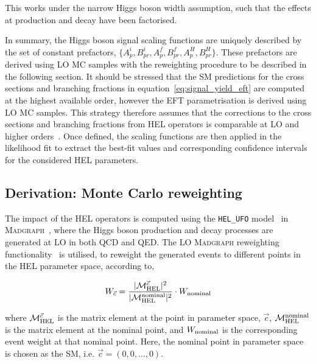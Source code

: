 \noindent
This works under the narrow Higgs boson width assumption, such that the effects at production and decay have been factorised.

In summary, the Higgs boson signal scaling functions are uniquely described by the set of constant prefactors, $\{A^i_p,B^i_{pr},A^f_p,B^f_{pr},A^{H}_p,B^{H}_{pr}\}$. These prefactors are derived using LO MC samples with the reweighting procedure to be described in the following section. It should be stressed that the SM predictions for the cross sections and branching fractions in equation~\ref{eq:signal_yield_eft} are computed at the highest available order, however the EFT parametrisation is derived using LO MC samples. This strategy therefore assumes that the corrections to the cross sections and branching fractions from HEL operators is comparable at LO and higher orders~\cite{Degrande:2016dqg}. Once defined, the scaling functions are then applied in the likelihood fit to extract the best-fit values and corresponding confidence intervals for the considered HEL parameters. 


\subsection{Derivation: Monte Carlo reweighting}\label{sec:hel_derivation}
The impact of the HEL operators is computed using the \texttt{HEL\_UFO} model~\cite{Alloul:2013naa} in \textsc{Madgraph}~\cite{Alwall:2014hca}, where the Higgs boson production and decay processes are generated at LO in both QCD and QED. The LO \textsc{Madgraph} reweighting functionality~\cite{Mattelaer:2016gcx} is utilised, to reweight the generated events to different points in the HEL parameter space, according to,

\begin{equation}
    W_{\vec{c}} = \frac{|\mathcal{M}^{\vec{c}}_{\rm{HEL}}|^2}{|\mathcal{M}^{\rm{nominal}}_{\rm{HEL}}|^2} \cdot W_{\rm{nominal}}
\end{equation}

\noindent
where $\mathcal{M}^{\vec{c}}_{\rm{HEL}}$ is the matrix element at the point in parameter space, $\vec{c}$, $\mathcal{M}^{\rm{nominal}}_{\rm{HEL}}$ is the matrix element at the nominal point, and $W_{\rm{nominal}}$ is the corresponding event weight at that nominal point. Here, the nominal point in parameter space is chosen as the SM, i.e. $\vec{c} = (0,0,...,0)$.

